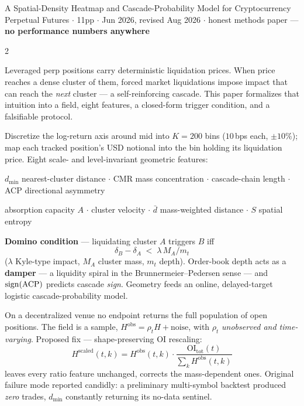 \documentclass[10pt,a4paper]{article}
\begin{document}
\small

{A Spatial-Density Heatmap and Cascade-Probability Model for Cryptocurrency Perpetual Futures}
{ $\cdot$ 11pp $\cdot$ Jun 2026, revised Aug 2026 $\cdot$
 honest methods paper — \textbf{no performance numbers anywhere}}

\begin{multicols}{2}

Leveraged perp positions carry deterministic liquidation prices. When price reaches a dense cluster of
them, forced market liquidations impose impact that can reach the \emph{next} cluster — a self-reinforcing
cascade. This paper formalizes that intuition into a field, eight features, a closed-form trigger
condition, and a falsifiable protocol.

Discretize the log-return axis around mid into $K=200$ bins ($10$\,bps each, $\pm10\%$); map each tracked
position's USD notional into the bin holding its liquidation price. Eight scale- and level-invariant
geometric features:
\begin{opitems}
\item $d_{\min}$ nearest-cluster distance $\cdot$ CMR mass concentration $\cdot$ cascade-chain length
      $\cdot$ ACP directional asymmetry
\item absorption capacity $A$ $\cdot$ cluster velocity $\cdot$ $\bar d$ mass-weighted distance $\cdot$
      $S$ spatial entropy
\end{opitems}

\textbf{Domino condition} — liquidating cluster $A$ triggers $B$ iff
\[
  \delta_B-\delta_A \;<\; \lambda\,M_A/m_t
\]
($\lambda$ Kyle-type impact, $M_A$ cluster mass, $m_t$ depth). Order-book depth acts as a \textbf{damper}
— a liquidity spiral in the Brunnermeier--Pedersen sense — and $\operatorname{sign}(\mathrm{ACP})$ predicts cascade
\emph{sign}. Geometry feeds an online, delayed-target logistic cascade-probability model.

On a decentralized venue no endpoint returns the full population of open positions. The field is a sample,
$H^{\mathrm{obs}}=\rho_t H+\text{noise}$, with $\rho_t$ \emph{unobserved and time-varying}. Proposed fix —
shape-preserving OI rescaling:
\[
  H^{\mathrm{scaled}}(t,k)=H^{\mathrm{obs}}(t,k)\cdot\frac{\mathrm{OI}_{\text{tot}}(t)}{\sum_k H^{\mathrm{obs}}(t,k)}
\]
leaves every ratio feature unchanged, corrects the mass-dependent ones. Original failure mode reported
candidly: a preliminary multi-symbol backtest produced \emph{zero} trades, $d_{\min}$ constantly returning
its no-data sentinel.


\end{multicols}
\end{document}

